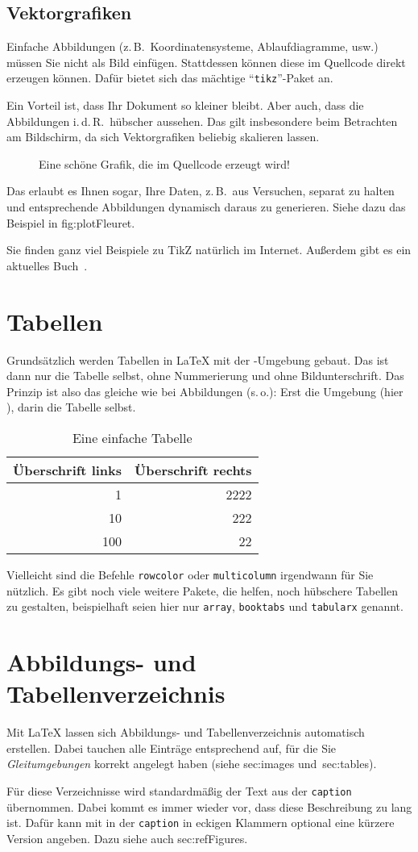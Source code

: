 \subsection{Vektorgrafiken}
\label{sec:vectorGraphcis}
%
Einfache Abbildungen (z.\,B.\ Koordinatensysteme, Ablaufdiagramme, usw.) müssen Sie nicht als Bild einfügen. Stattdessen können diese im Quellcode direkt erzeugen können. Dafür bietet sich das mächtige \enquote{\texttt{tikz}}-Paket an.
\par
Ein Vorteil ist, dass Ihr Dokument so kleiner bleibt. Aber auch, dass die Abbildungen i.\,d.\,R.\ hübscher aussehen. Das gilt insbesondere beim Betrachten am Bildschirm, da sich Vektorgrafiken beliebig skalieren lassen.
%
\begin{figure}[tbh]
\centering

\caption{Eine schöne Grafik, die im Quellcode erzeugt wird!}
\label{fig:plotFleuret}
\end{figure}
%
Das erlaubt es Ihnen sogar, Ihre Daten, z.\,B.\ aus Versuchen, separat zu halten und entsprechende Abbildungen dynamisch daraus zu generieren. Siehe dazu das Beispiel in fig:plotFleuret.
\par
Sie finden ganz viel Beispiele zu TikZ natürlich im Internet. Außerdem gibt es ein aktuelles Buch~\cite{kottwitz:tikz}.
%
%
\section{Tabellen}
\label{sec:tables}
Grundsätzlich werden Tabellen in \LaTeX{} mit der -Umgebung gebaut. Das ist dann nur die Tabelle selbst, ohne Nummerierung und ohne Bildunterschrift. Das Prinzip ist also das gleiche wie bei Abbildungen (s.\,o.): Erst die Umgebung (hier ), darin die Tabelle selbst.
%
\begin{table}[tbh]
 \centering
 \begin{tabular}{r|r}
 Überschrift links & Überschrift rechts\\
 \hline
 1   & 2222\\
 10  & 222\\
 100 & 22
 \end{tabular}
 \caption{Eine einfache Tabelle}
 \label{tab:example}
\end{table}
%
Vielleicht sind die Befehle \texttt{rowcolor} oder \texttt{multicolumn} irgendwann für Sie nützlich. Es gibt noch viele weitere Pakete, die helfen, noch hübschere Tabellen zu gestalten, beispielhaft seien hier nur \texttt{array}, \texttt{booktabs} und \texttt{tabularx} genannt.
%
%
\section{Abbildungs- und Tabellenverzeichnis}
\label{sec:captions}
Mit \LaTeX{} lassen sich Abbildungs- und Tabellenverzeichnis automatisch erstellen. Dabei tauchen alle Einträge entsprechend auf, für die Sie \emph{Gleitumgebungen} korrekt angelegt haben (siehe sec:images und~sec:tables).
\par
Für diese Verzeichnisse wird standardmäßig der Text aus der \texttt{caption} übernommen. Dabei kommt es immer wieder vor, dass diese Beschreibung zu lang ist. Dafür kann mit in der \texttt{caption} in eckigen Klammern optional eine kürzere Version angeben. Dazu siehe auch sec:refFigures.
%
%
